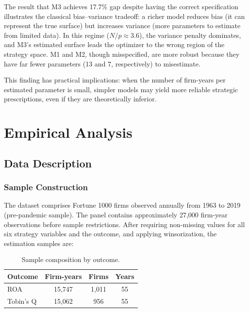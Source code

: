 \documentclass[12pt]{article}
\begin{document}
The result that M3 achieves 17.7\% gap despite having the correct specification illustrates the classical bias--variance tradeoff: a richer model reduces bias (it can represent the true surface) but increases variance (more parameters to estimate from limited data). In this regime ($N/p \approx 3.6$), the variance penalty dominates, and M3's estimated surface leads the optimizer to the wrong region of the strategy space. M1 and M2, though misspecified, are more robust because they have far fewer parameters (13 and 7, respectively) to misestimate.

This finding has practical implications: when the number of firm-years per estimated parameter is small, simpler models may yield more reliable strategic prescriptions, even if they are theoretically inferior.


\section{Empirical Analysis}
\label{sec:empirical}

\subsection{Data Description}
\label{sec:data}

\subsubsection{Sample Construction}

The dataset comprises Fortune 1000 firms observed annually from 1963 to 2019 (pre-pandemic sample). The panel contains approximately 27,000 firm-year observations before sample restrictions. After requiring non-missing values for all six strategy variables and the outcome, and applying winsorization, the estimation samples are:

\begin{table}[htbp]
\centering
\caption{Sample composition by outcome.}
\label{tab:sample}
\begin{tabular}{lccc}
\toprule
Outcome   & Firm-years & Firms & Years \\
\midrule
ROA       & 15,747     & 1,011 & 55    \\
Tobin's Q & 15,062     &   956 & 55    \\
\bottomrule
\end{tabular}
\end{table}
\end{document}
